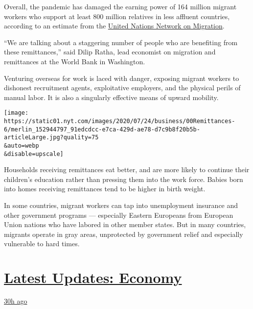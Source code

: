 Overall, the pandemic has damaged the earning power of 164 million
migrant workers who support at least 800 million relatives in less
affluent countries, according to an estimate from the
\href{https://migrationnetwork.un.org/sites/default/files/policy_brief-_remittances_in_the_time_of_covid-19.pdf}{United
Nations Network on Migration}.

``We are talking about a staggering number of people who are benefiting
from these remittances,'' said Dilip Ratha, lead economist on migration
and remittances at the World Bank in Washington.

Venturing overseas for work is laced with danger, exposing migrant
workers to dishonest recruitment agents, exploitative employers, and the
physical perils of manual labor. It is also a singularly effective means
of upward mobility.

\texttt{[image: https://static01.nyt.com/images/2020/07/24/business/00Remittances-6/merlin\_152944797\_91edcdcc-e7ca-429d-ae78-d7c9b8f20b5b-articleLarge.jpg?quality=75\\\&auto=webp\\\&disable=upscale]}

Households receiving remittances eat better, and are more likely to
continue their children's education rather than pressing them into the
work force. Babies born into homes receiving remittances tend to be
higher in birth weight.

In some countries, migrant workers can tap into unemployment insurance
and other government programs --- especially Eastern Europeans from
European Union nations who have labored in other member states. But in
many countries, migrants operate in gray areas, unprotected by
government relief and especially vulnerable to hard times.

\hypertarget{latest-updates-economy}{%
\section{\texorpdfstring{\href{https://www.nytimes.com/live/2020/07/31/business/stock-market-today-coronavirus?action=click\&pgtype=Article\&state=default\&region=MAIN_CONTENT_1\&context=storylines_live_updates}{Latest
Updates:
Economy}}{Latest Updates: Economy}}\label{latest-updates-economy}}

\href{https://www.nytimes.com/live/2020/07/31/business/stock-market-today-coronavirus?action=click\&pgtype=Article\&state=default\&region=MAIN_CONTENT_1\&context=storylines_live_updates\#kodaks-chief-executive-was-given-stock-options-then-the-share-price-spiked-1000-percent}{30h
ago}

